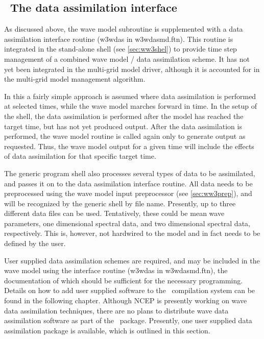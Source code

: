 \vssub
\subsection{~The data assimilation interface} \label{sec:das}
\vssub

As discussed above, the wave model subroutine is supplemented with a data
assimilation interface routine ({\F w3wdas} in {\file w3wdasmd.ftn}). This
routine is integrated in the stand-alone shell (see \para\ref{sec:ww3shel}) to
provide time step management of a combined wave model / data assimilation
scheme. It has not yet been integrated in the multi-grid model driver,
although it is accounted for in the multi-grid model management
algorithm. 

In this a fairly simple approach is assumed where data assimilation
is performed at selected times, while the wave model marches forward in
time. In the setup of the shell, the data assimilation is performed after the
model has reached the target time, but has not yet produced output. After the
data assimilation is performed, the wave model routine is called again only to
generate output as requested. Thus, the wave model output for a given time
will include the effects of data assimilation for that specific target time.

The generic program shell also processes several types of data to be
assimilated, and passes it on to the data assimilation interface routine. All
data needs to be preprocessed using the wave model input preprocessor (see
\para\ref{sec:ww3prep}), and will be recognized by the generic shell by file
name. Presently, up to three different data files can be used. Tentatively,
these could be mean wave parameters, one dimensional spectral data, and two
dimensional spectral data, respectively. This is, however, not hardwired to
the model and in fact needs to be defined by the user.

User supplied
data assimilation schemes are required, and may be included in the wave model 
using the interface routine ({\F w3wdas} in {\file w3wdasmd.ftn}), the documentation 
of which should be sufficient for the necessary programming. Details on how to add 
user supplied software to the \ws\ compilation system can be found in the following
chapter. Although NCEP is presently working on wave data assimilation techniques, 
 there are no plans to distribute wave data assimilation software as part of the 
\ws\ package.
Presently, one user supplied data assimilation package is available, which
is outlined in this section.
